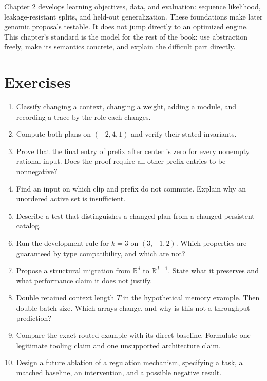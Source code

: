 Chapter 2 develops learning objectives, data, and evaluation: sequence likelihood, leakage-resistant splits, and held-out generalization. These foundations make later genomic proposals testable. It does not jump directly to an optimized engine. This chapter's standard is the model for the rest of the book: use abstraction freely, make its semantics concrete, and explain the difficult part directly.

\section{Exercises}\label{sec:exercises}
\begin{enumerate}
\item Classify changing a context, changing a weight, adding a module, and recording a trace by the role each changes.
\item Compute both plans on $(-2,4,1)$ and verify their stated invariants.
\item Prove that the final entry of prefix after center is zero for every nonempty rational input. Does the proof require all other prefix entries to be nonnegative?
\item Find an input on which clip and prefix do not commute. Explain why an unordered active set is insufficient.
\item Describe a test that distinguishes a changed plan from a changed persistent catalog.
\item Run the development rule for $k=3$ on $(3,-1,2)$. Which properties are guaranteed by type compatibility, and which are not?
\item Propose a structural migration from $\mathbb R^d$ to $\mathbb R^{d+1}$. State what it preserves and what performance claim it does not justify.
\item Double retained context length $T$ in the hypothetical memory example. Then double batch size. Which arrays change, and why is this not a throughput prediction?
\item Compare the exact routed example with its direct baseline. Formulate one legitimate tooling claim and one unsupported architecture claim.
\item Design a future ablation of a regulation mechanism, specifying a task, a matched baseline, an intervention, and a possible negative result.
\end{enumerate}

